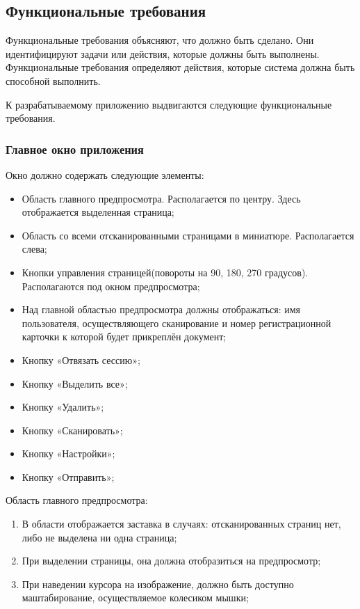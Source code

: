 \subsection{Функциональные требования}
\label{sub:requirements:func_rec}

Функциональные требования объясняют, что должно быть сделано. Они идентифицируют задачи или действия, которые должны быть выполнены. Функциональные требования определяют действия, которые система должна быть способной выполнить.

К разрабатываемому приложению выдвигаются следующие функциональные требования.

\subsubsection{Главное окно приложения }
\label{sub:requirements:func_rec:main_window}

Окно должно содержать следующие элементы:
\begin{itemize}
	\item Область главного предпросмотра. Располагается по центру. Здесь отображается выделенная страница;
	\item Область со всеми отсканированными страницами в миниатюре. Располагается слева;
	\item Кнопки управления страницей(повороты на 90, 180, 270 градусов). Располагаются под окном предпросмотра;
	\item Над главной областью предпросмотра должны отображаться: имя пользователя, осуществляющего сканирование и номер регистрационной карточки к которой будет прикреплён документ;
	\item Кнопку «Отвязать сессию»;
	\item Кнопку «Выделить все»;
	\item Кнопку «Удалить»;
	\item Кнопку «Сканировать»;
	\item Кнопку «Настройки»;
	\item Кнопку «Отправить»;

\end{itemize}

Область главного предпросмотра: 
\begin{enumerate}
	\item В области отображается заставка в случаях: отсканированных страниц нет, либо не выделена ни одна страница;
  	\item При выделении страницы, она должна отобразиться на предпросмотр;
 	\item При наведении курсора на изображение, должно быть доступно маштабирование, осуществляемое колесиком мышки;
\end{enumerate}

